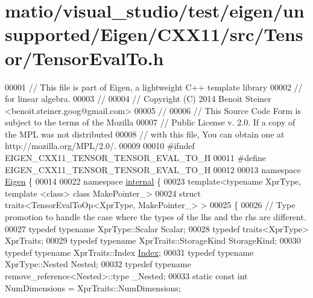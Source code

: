 \hypertarget{matio_2visual__studio_2test_2eigen_2unsupported_2_eigen_2_c_x_x11_2src_2_tensor_2_tensor_eval_to_8h_source}{}\section{matio/visual\+\_\+studio/test/eigen/unsupported/\+Eigen/\+C\+X\+X11/src/\+Tensor/\+Tensor\+Eval\+To.h}
\label{matio_2visual__studio_2test_2eigen_2unsupported_2_eigen_2_c_x_x11_2src_2_tensor_2_tensor_eval_to_8h_source}

\begin{DoxyCode}
00001 \textcolor{comment}{// This file is part of Eigen, a lightweight C++ template library}
00002 \textcolor{comment}{// for linear algebra.}
00003 \textcolor{comment}{//}
00004 \textcolor{comment}{// Copyright (C) 2014 Benoit Steiner <benoit.steiner.goog@gmail.com>}
00005 \textcolor{comment}{//}
00006 \textcolor{comment}{// This Source Code Form is subject to the terms of the Mozilla}
00007 \textcolor{comment}{// Public License v. 2.0. If a copy of the MPL was not distributed}
00008 \textcolor{comment}{// with this file, You can obtain one at http://mozilla.org/MPL/2.0/.}
00009 
00010 \textcolor{preprocessor}{#ifndef EIGEN\_CXX11\_TENSOR\_TENSOR\_EVAL\_TO\_H}
00011 \textcolor{preprocessor}{#define EIGEN\_CXX11\_TENSOR\_TENSOR\_EVAL\_TO\_H}
00012 
00013 \textcolor{keyword}{namespace }\hyperlink{namespace_eigen}{Eigen} \{
00014 
00022 \textcolor{keyword}{namespace }\hyperlink{namespaceinternal}{internal} \{
00023 \textcolor{keyword}{template}<\textcolor{keyword}{typename} XprType, \textcolor{keyword}{template} <\textcolor{keyword}{class}> \textcolor{keyword}{class }MakePointer\_>
00024 \textcolor{keyword}{struct }traits<TensorEvalToOp<XprType, MakePointer\_> >
00025 \{
00026   \textcolor{comment}{// Type promotion to handle the case where the types of the lhs and the rhs are different.}
00027   \textcolor{keyword}{typedef} \textcolor{keyword}{typename} XprType::Scalar Scalar;
00028   \textcolor{keyword}{typedef} traits<XprType> XprTraits;
00029   \textcolor{keyword}{typedef} \textcolor{keyword}{typename} XprTraits::StorageKind StorageKind;
00030   \textcolor{keyword}{typedef} \textcolor{keyword}{typename} XprTraits::Index \hyperlink{namespace_eigen_a62e77e0933482dafde8fe197d9a2cfde}{Index};
00031   \textcolor{keyword}{typedef} \textcolor{keyword}{typename} XprType::Nested Nested;
00032   \textcolor{keyword}{typedef} \textcolor{keyword}{typename} remove\_reference<Nested>::type \_Nested;
00033   \textcolor{keyword}{static} \textcolor{keyword}{const} \textcolor{keywordtype}{int} NumDimensions = XprTraits::NumDimensions;

\end{DoxyCode}
